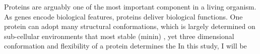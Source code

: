 Proteins are arguably one of the most important component in a living organism. As genes encode biological features, proteins deliver biological functions. One protein can adopt many structural conformations, which is largely determined on sub-cellular environments that most stable (minin) , yet three dimensional conformation and flexibility of a protein determines the     In this study, I will be 